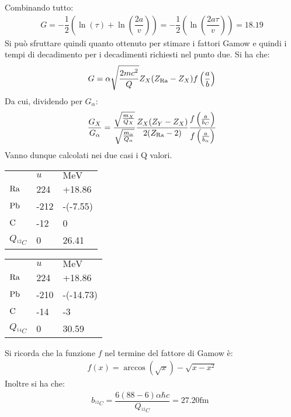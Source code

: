 \documentclass[../main.tex]{subfiles}
\begin{document}
\begin{svol}
			Combinando tutto:
			\begin{gather}
				G=-\dfrac{1}{2}\left(\ln(\tau)+\ln\left(\dfrac{2a}{v}\right)\right)=-\dfrac{1}{2}\left(\ln\left(\dfrac{2a\tau}{v}\right)\right)=18.19
			\end{gather} 
			Si può sfruttare quindi quanto ottenuto per stimare i fattori Gamow e quindi i tempi di decadimento per i decadimenti richiesti nel punto due. Si ha che:
			\begin{gather}
				G=\alpha\sqrt{\dfrac{2mc^{2}}{Q}}Z_{X}(Z_{\mathrm{Ra}}-Z_{X})f\left(\dfrac{a}{b}\right)
			\end{gather} 
			Da cui, dividendo per $ G_{\alpha} $:
			\begin{gather} \dfrac{G_{X}}{G_{\alpha}}=\dfrac{\sqrt{\frac{m_{X}}{Q_{X}}}}{\sqrt{\frac{m_{\alpha}}{Q_{\alpha}}}}\dfrac{Z_{X}(Z_{Y}-Z_{X})}{2(Z_{\mathrm{Ra}}-2)}\dfrac{f\left(\frac{a}{b_{C}}\right)}{f\left(\frac{a}{b_{\alpha}}\right)}
			\end{gather}
			Vanno dunque calcolati nei due casi i Q valori. 
			\begin{center}
				\begin{tabular}{lll}
					& $ \si{u} $ & $ \si{\mega\electronvolt} $ \\
					$ \mathrm{Ra} $  & 224 & +18.86\\
					$ \mathrm{Pb} $  & -212 & -(-7.55) \\
					$ \mathrm{C} $ & -12 & 0 \\\hline
					$ Q_{^{12}C} $ & 0 & 26.41 \\
				\end{tabular}
				\begin{tabular}{lll}
					& $ \si{u} $ & $ \si{\mega\electronvolt} $ \\
					$ \mathrm{Ra} $  & 224 & +18.86\\
					$ \mathrm{Pb} $  & -210 & -(-14.73) \\
					$ \mathrm{C} $ & -14 & -3 \\\hline
					$ Q_{^{14}C} $ & 0 & 30.59 \\
				\end{tabular}
			\end{center}
		Si ricorda che la funzione $ f $ nel termine del fattore di Gamow è: 
		\begin{gather} f(x)=\arccos(\sqrt{x})-\sqrt{x-x^{2}}
		\end{gather}
		Inoltre si ha che:
		\begin{gather} b_{^{12}C}=\dfrac{6(88-6)\alpha\hbar c}{Q_{^{12}C}}=27.20\si{\femto\meter}\ \ 

\end{gather}
\end{svol}
\end{document}
